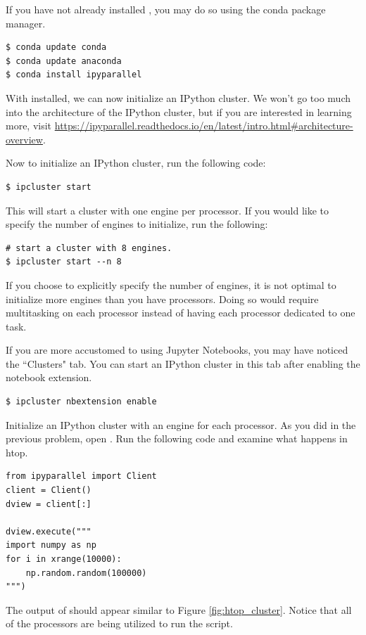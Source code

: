 If you have not already installed , you may do so using the conda package manager.

\begin{lstlisting}
$ conda update conda
$ conda update anaconda
$ conda install ipyparallel
\end{lstlisting}

With  installed, we can now initialize an IPython cluster. We won't go too much into the architecture of the IPython cluster, but if you are interested in learning more, visit \url{https://ipyparallel.readthedocs.io/en/latest/intro.html#architecture-overview}.

Now to initialize an IPython cluster, run the following code:

\begin{lstlisting}
$ ipcluster start
\end{lstlisting}

This will start a cluster with one engine per processor. If you would like to specify the number of engines to initialize, run the following:

\begin{lstlisting}
# start a cluster with 8 engines.
$ ipcluster start --n 8
\end{lstlisting}

If you choose to explicitly specify the number of engines, it is not optimal to initialize more engines than you have processors. Doing so would require multitasking on each processor instead of having each processor dedicated to one task.

If you are more accustomed to using Jupyter Notebooks, you may have noticed the ``Clusters" tab. You can start an IPython cluster in this tab after enabling the  notebook extension.

\begin{lstlisting}
$ ipcluster nbextension enable
\end{lstlisting}

\begin{problem}
Initialize an IPython cluster with an engine for each processor. As you did in the previous problem, open . Run the following code and examine what happens in htop.

\begin{lstlisting}
from ipyparallel import Client
client = Client()
dview = client[:]

dview.execute("""
import numpy as np
for i in xrange(10000):
    np.random.random(100000)
""")
\end{lstlisting}

The output of  should appear similar to Figure \ref{fig:htop_cluster}. Notice that all of the processors are being utilized to run the script.
\end{problem}

